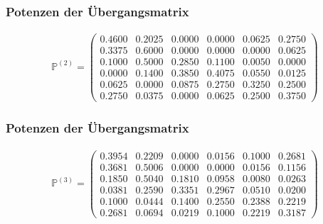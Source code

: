 \documentclass[compress]{beamer}
\begin{document}
	\begin{frame}
		\frametitle{Potenzen der Übergangsmatrix}
		\begin{center}
			\begin{align*}
				\mathbb{P} ^{(2)} =
				\begin{pmatrix} 
				  0.4600 &  0.2025 &  0.0000 &  0.0000 &  0.0625 &  0.2750\\
				  0.3375 &  0.6000 &  0.0000 &  0.0000 &  0.0000 &  0.0625\\
				  0.1000 &  0.5000 &  0.2850 &  0.1100 &  0.0050 &  0.0000\\
				  0.0000 &  0.1400 &  0.3850 &  0.4075 &  0.0550 &  0.0125\\
				  0.0625 &  0.0000 &  0.0875 &  0.2750 &  0.3250 &  0.2500\\
				  0.2750 &  0.0375 &  0.0000 &  0.0625 &  0.2500 &  0.3750
				\end{pmatrix} 
			\end{align*}
		\end{center}
	\end{frame}

	\begin{frame}
		\frametitle{Potenzen der Übergangsmatrix}
		\begin{center}
			\begin{align*}
				\mathbb{P} ^{(3)} =
				\begin{pmatrix} 
				  0.3954 &  0.2209 &  0.0000 &  0.0156 &  0.1000 &  0.2681\\
				  0.3681 &  0.5006 &  0.0000 &  0.0000 &  0.0156 &  0.1156\\
				  0.1850 &  0.5040 &  0.1810 &  0.0958 &  0.0080 &  0.0263\\
				  0.0381 &  0.2590 &  0.3351 &  0.2967 &  0.0510 &  0.0200\\
				  0.1000 &  0.0444 &  0.1400 &  0.2550 &  0.2388 &  0.2219\\
				  0.2681 &  0.0694 &  0.0219 &  0.1000 &  0.2219 &  0.3187
				\end{pmatrix} 
			\end{align*}
		\end{center}
	\end{frame}
\end{document}
